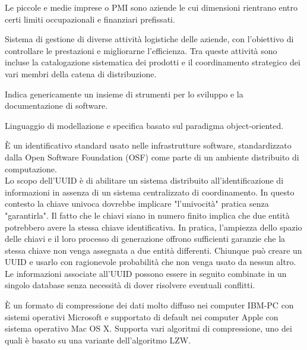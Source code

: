 \begin{acronym}[HTML5]
	
	{\small Le piccole e medie imprese o PMI sono aziende le cui dimensioni rientrano entro certi limiti occupazionali e finanziari prefissati. \par}

	
	{\small Sistema di gestione di diverse attività logistiche delle aziende, con l'obiettivo di controllare le prestazioni e migliorarne l'efficienza. Tra queste attività sono incluse la catalogazione sistematica dei prodotti e il coordinamento strategico dei vari membri della catena di distribuzione. \par}

	
	{\small Indica genericamente un insieme di strumenti per lo sviluppo e la documentazione di software. \par}

	
	{\small  Linguaggio di modellazione e specifica basato sul paradigma object-oriented. \par}
	
	
	{\small È un identificativo standard usato nelle infrastrutture software, standardizzato dalla Open Software Foundation (OSF) come parte di un ambiente distribuito di computazione.\\
Lo scopo dell'UUID è di abilitare un sistema distribuito all'identificazione di informazioni in assenza di un sistema centralizzato di coordinamento. In questo contesto la chiave univoca dovrebbe implicare "l'univocità" pratica senza "garantirla". Il fatto che le chiavi siano in numero finito implica che due entità potrebbero avere la stessa chiave identificativa. In pratica, l'ampiezza dello spazio delle chiavi e il loro processo di generazione offrono sufficienti garanzie che la stessa chiave non venga assegnata a due entità differenti. Chiunque può creare un UUID e usarlo con ragionevole probabilità che non venga usato da nessun altro. Le informazioni associate all'UUID possono essere in seguito combinate in un singolo database senza necessità di dover risolvere eventuali conflitti. \par}
	
	{\small È un formato di compressione dei dati molto diffuso nei computer IBM-PC con sistemi operativi Microsoft e supportato di default nei computer Apple con sistema operativo Mac OS X. Supporta vari algoritmi di compressione, uno dei quali è basato su una variante dell'algoritmo LZW. \par}
\end{acronym}
